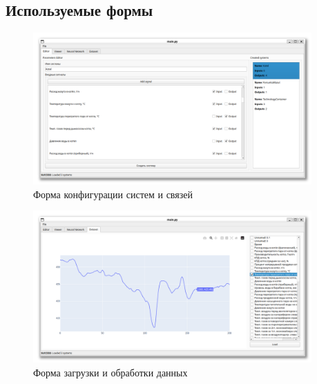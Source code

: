 \subsection{Используемые формы}

\begin{figure}[H]
  \begin{center}
    \includegraphics[width=0.95\textwidth]{figures/modules/editor.png}
  \end{center}
  \caption{Форма конфигурации систем и связей}\label{fig:forms:editor}
\end{figure}

\begin{figure}[H]
  \begin{center}
    \includegraphics[width=0.95\textwidth]{figures/modules/loader.png}
  \end{center}
  \caption{Форма загрузки и обработки данных}\label{fig:forms:loader}
\end{figure}


